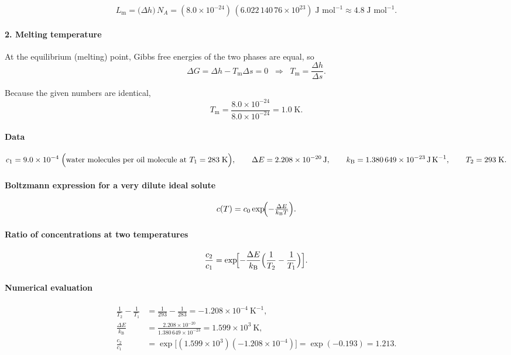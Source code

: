 \documentclass[12pt]{article}
\theoremstyle{definition} %
\theoremstyle{plain} %
\begin{document}
\[
  L_{\text{m}} 
  = \bigl(\Delta h\bigr)\,N_{\!A}
  = (8.0\times10^{-24})\,
    (6.022\,140\,76\times10^{23})
  \;\text{J mol}^{-1}
  \approx \boxed{4.8\;\text{J mol}^{-1}}.
\]

\paragraph{2.  Melting temperature}

At the equilibrium (melting) point, Gibbs free energies of the two phases
are equal, so
\[
  \Delta G = \Delta h - T_{\text{m}}\Delta s = 0
  \;\;\Longrightarrow\;\;
  T_{\text{m}} = \frac{\Delta h}{\Delta s}.
\]

Because the given numbers are identical,
\[
  T_{\text{m}} 
  = \frac{8.0\times10^{-24}}{8.0\times10^{-24}}
  = \boxed{1.0\;\text{K}}.
\]
\paragraph{Data}
\[
c_1 = 9.0\times10^{-4}\;
      \Bigl(\text{water molecules per oil molecule at }T_1=283\;\text{K}\Bigr),
\qquad
\Delta E = 2.208\times10^{-20}\,\text{J},
\qquad
k_{\mathrm B}=1.380\,649\times10^{-23}\,\text{J\,K}^{-1},
\qquad
T_2 = 293\;\text{K}.
\]

\paragraph{Boltzmann expression for a very dilute ideal solute}
\[
c(T)=c_0\exp\!\Bigl(-\tfrac{\Delta E}{k_{\mathrm B}T}\Bigr).
\]

\paragraph{Ratio of concentrations at two temperatures}
\[
\frac{c_2}{c_1}
  =\exp\!\Bigl[-\frac{\Delta E}{k_{\mathrm B}}
                \Bigl(\frac{1}{T_2}-\frac{1}{T_1}\Bigr)\Bigr].
\]

\paragraph{Numerical evaluation}
\[
\begin{aligned}
\frac{1}{T_2}-\frac{1}{T_1} &=\frac{1}{293}-\frac{1}{283}
                              =-1.208\times10^{-4}\ \text{K}^{-1},\\[6pt]
\frac{\Delta E}{k_{\mathrm B}}
                            &=\frac{2.208\times10^{-20}}
                                   {1.380\,649\times10^{-23}}
                              =1.599\times10^{3}\ \text{K},\\[6pt]
\frac{c_2}{c_1}
  &=\exp\!\bigl[(1.599\times10^{3})(-1.208\times10^{-4})\bigr]
   =\exp(-0.193)=1.213.
\end{aligned}
\]
\end{document}
